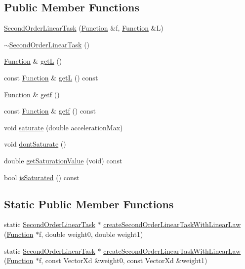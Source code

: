 \subsection*{Public Member Functions}
\begin{DoxyCompactItemize}
\item 
\hyperlink{classocra_1_1SecondOrderLinearTask_ac54c18fe5d5ba11cfc728361a8ab86eb}{Second\+Order\+Linear\+Task} (\hyperlink{classocra_1_1Function}{Function} \&f, \hyperlink{classocra_1_1Function}{Function} \&L)
\item 
\hyperlink{classocra_1_1SecondOrderLinearTask_a9d27ffc898ce40ba091c59fd3e4bea6e}{$\sim$\+Second\+Order\+Linear\+Task} ()
\item 
\hyperlink{classocra_1_1Function}{Function} \& \hyperlink{classocra_1_1SecondOrderLinearTask_a626defc13e1da5ae7b340b9e8591c840}{getL} ()
\item 
const \hyperlink{classocra_1_1Function}{Function} \& \hyperlink{classocra_1_1SecondOrderLinearTask_a0e4685dc9218fa7ecc6dead3dfa43ad5}{getL} () const 
\item 
\hyperlink{classocra_1_1Function}{Function} \& \hyperlink{classocra_1_1SecondOrderLinearTask_ac370b605ace05a35f3a5f68a49439c2d}{getf} ()
\item 
const \hyperlink{classocra_1_1Function}{Function} \& \hyperlink{classocra_1_1SecondOrderLinearTask_a23971517b58ae449ea4ef817bb3b44e4}{getf} () const 
\item 
void \hyperlink{classocra_1_1SecondOrderLinearTask_ad49dff8c7451d4753126328d3a47e4ba}{saturate} (double acceleration\+Max)
\item 
void \hyperlink{classocra_1_1SecondOrderLinearTask_a8e155a518199e0ae1b8eca4915d46420}{dont\+Saturate} ()
\item 
double \hyperlink{classocra_1_1SecondOrderLinearTask_ae0b6cb520adc6c245f8478a32b808232}{get\+Saturation\+Value} (void) const 
\item 
bool \hyperlink{classocra_1_1SecondOrderLinearTask_a615eb2b5ff07c6e2fe4dd530d6059476}{is\+Saturated} () const 
\end{DoxyCompactItemize}
\subsection*{Static Public Member Functions}
\begin{DoxyCompactItemize}
\item 
static \hyperlink{classocra_1_1SecondOrderLinearTask}{Second\+Order\+Linear\+Task} $\ast$ \hyperlink{classocra_1_1SecondOrderLinearTask_a9d9b45129ef6c513cf67bc55c33aae05}{create\+Second\+Order\+Linear\+Task\+With\+Linear\+Law} (\hyperlink{classocra_1_1Function}{Function} $\ast$f, double weight0, double weight1)
\item 
static \hyperlink{classocra_1_1SecondOrderLinearTask}{Second\+Order\+Linear\+Task} $\ast$ \hyperlink{classocra_1_1SecondOrderLinearTask_a3320983d1930ac8b049116b186d17dd1}{create\+Second\+Order\+Linear\+Task\+With\+Linear\+Law} (\hyperlink{classocra_1_1Function}{Function} $\ast$f, const Vector\+Xd \&weight0, const Vector\+Xd \&weight1)
\end{DoxyCompactItemize}
